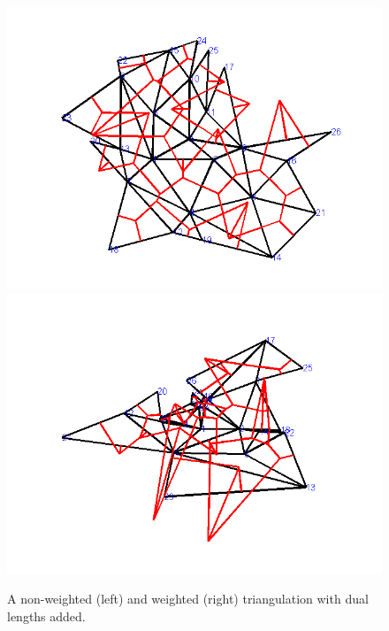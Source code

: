 \documentclass[12pt]{article}
\begin{document}
\begin{figure}
\centering
\includegraphics[scale = .45]{Pictures/nonwduals.png}
\includegraphics[scale = .45]{Pictures/Wduals.png}
\caption{A non-weighted (left) and weighted (right) triangulation with dual lengths added.}
\label{Duals}
\end{figure}
\end{document}
